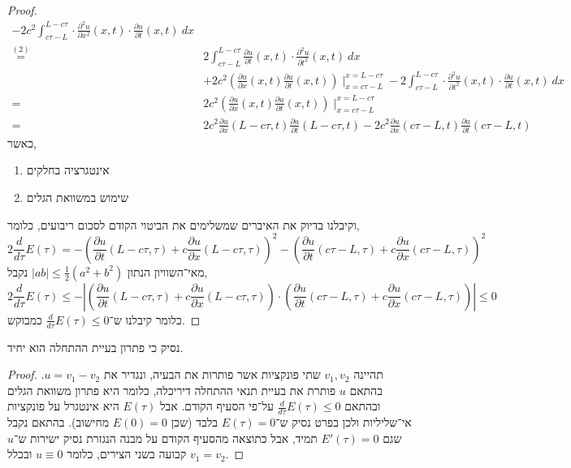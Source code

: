 \begin{proof}
\begin{align*}
		- 2 c^2 \int_{c \tau - L}^{L - c \tau} \cdot \frac{\partial^2 u}{\partial x^2}(x, t) \cdot \frac{\partial u}{\partial t}(x, t)\ dx \\
		\overset{(2)}{=}  & 2 \int_{c \tau - L}^{L - c \tau} \frac{\partial u}{\partial t}(x, t) \cdot \frac{\partial^2 u}{\partial t^2}(x, t)\ dx \\
		& + 2 c^2 (\frac{\partial u}{\partial x}(x, t) \frac{\partial u}{\partial t}(x, t)) \mid_{x = c \tau - L}^{x = L - c \tau}
		- 2 \int_{c \tau - L}^{L - c \tau} \cdot \frac{\partial^2 u}{\partial t^2}(x, t) \cdot \frac{\partial u}{\partial t}(x, t)\ dx \\
		= & 2 c^2 \left(\frac{\partial u}{\partial x}(x, t) \frac{\partial u}{\partial t}(x, t)\right) \mid_{x = c \tau - L}^{x = L - c \tau} \\
		= & 2 c^2 \frac{\partial u}{\partial x}(L - c \tau, t) \frac{\partial u}{\partial t}(L - c \tau, t) - 2 c^2 \frac{\partial u}{\partial x}(c \tau - L, t) \frac{\partial u}{\partial t}(c \tau - L, t)
	\end{align*}
	כאשר,
	\begin{enumerate}
		\item אינטגרציה בחלקים
		\item שימוש במשוואת הגלים
	\end{enumerate}
	וקיבלנו בדיוק את האיברים שמשלימים את הביטוי הקודם לסכום ריבועים, כלומר,
	\[
		2 \frac{d}{d \tau} E(\tau)
		= -{\left(\frac{\partial u}{\partial t}(L - c \tau, \tau) + c \frac{\partial u}{\partial x}(L - c \tau, \tau)\right)}^2
		- {\left(\frac{\partial u}{\partial t}(c \tau - L, \tau) + c \frac{\partial u}{\partial x}(c \tau - L, \tau)\right)}^2
	\]
	מאי־השוויון הנתון $|ab| \le \frac{1}{2}(a^2 + b^2)$ נקבל,
	\[
		2 \frac{d}{d \tau} E(\tau)
		\le -\left\lvert \left(\frac{\partial u}{\partial t}(L - c \tau, \tau) + c \frac{\partial u}{\partial x}(L - c \tau, \tau)\right)
		\cdot \left(\frac{\partial u}{\partial t}(c \tau - L, \tau) + c \frac{\partial u}{\partial x}(c \tau - L, \tau)\right) \right\rvert
		\le 0
	\]
	כלומר קיבלנו ש־$\frac{d}{d \tau} E(\tau) \le 0$ כמבוקש.
\end{proof}

\subquestion{}
נסיק כי פתרון בעיית ההתחלה הוא יחיד.
\begin{proof}
	תהיינה $v_1, v_2$ שתי פונקציות אשר פותרות את הבעיה, ונגדיר את $u = v_1 - v_2$.
	בהתאם $u$ פותרת את בעיית תנאי ההתחלה דיריכלה, כלומר היא פתרון משוואת הגלים ובהתאם $\frac{d}{d \tau} E(\tau) \le 0$ על־פי הסעיף הקודם.
	אבל $E(\tau)$ היא אינטגרל על פונקציות אי־שליליות ולכן בפרט נסיק ש־$E(\tau) = 0$ בלבד (שכן $E(0) = 0$ מחישוב).
	בהתאם נקבל שגם $E'(\tau) = 0$ תמיד, אבל כתוצאה מהסעיף הקודם על מבנה הנגזרת נסיק ישירות ש־$u$ קבועה בשני הצירים, כלומר $u \equiv 0$ ובכלל $v_1 = v_2$.
\end{proof}


